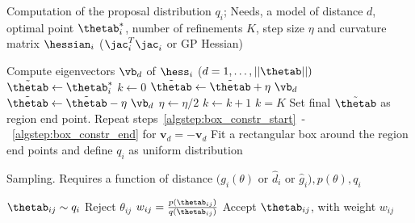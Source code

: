 \begin{algorithm}[!ht]
	\caption{Computation of the proposal distribution $q_i$; Needs, a model of distance $d$, optimal point $\thetab_i^*$, number of refinements $K$, step size $\eta$ and curvature matrix $\hessian_i$ ($\jac_i^T\jac_i $ or GP Hessian)}\label{alg:region_construction}
	\begin{algorithmic}[1]
	\State Compute eigenvectors $\vb_{d}$ of $\hess_i$ {\scriptsize ($d = 1,\ldots,||\thetab ||)$}
		\State $\Tilde{\thetab} \gets \thetab_i^*$ \label{algstep:box_constr_start}
		\State $k \gets 0$
		\Repeat
        	\Repeat
                \State $\Tilde{\thetab} \gets \Tilde{\thetab} + \eta \ \vb_{d}$ 
        	\State $\Tilde{\thetab} \gets \Tilde{\thetab} - \eta \ \vb_{d}$
        	\State $\eta \gets \eta/2$ 
        	\State $k \gets k + 1$
    	\Until $k = K$
    	\State Set final $\Tilde{\thetab}$ as region end point. \label{algstep:box_constr_end}
    	\State Repeat steps~\ref{algstep:box_constr_start}~-~\ref{algstep:box_constr_end} for $\mathbf{v}_{d} = - \mathbf{v}_{d}$
	\EndFor
	\State Fit a rectangular box around the region end points and define $q_i$ as uniform distribution
	\end{algorithmic}
\end{algorithm}

\begin{algorithm}[H]
    \centering
    \caption{Sampling. Requires a function of distance $(g_i(\theta)$ or $\hat{d}_i$ or $\hat{g}_i), p(\theta), q_i$}\label{alg:sampling_GB}
    \begin{algorithmic}[1]
          \State $\thetab_{ij} \sim q_i$
            \State Reject $\theta_{ij}$
          \Else {}
            \State $w_{ij} = \frac{p(\thetab_{ij})}{q(\thetab_{ij})}$
            \State Accept $\thetab_{ij}$, with weight $w_{ij}$
          \EndIf
      \EndFor
      \EndFor
    \end{algorithmic}
\end{algorithm}
